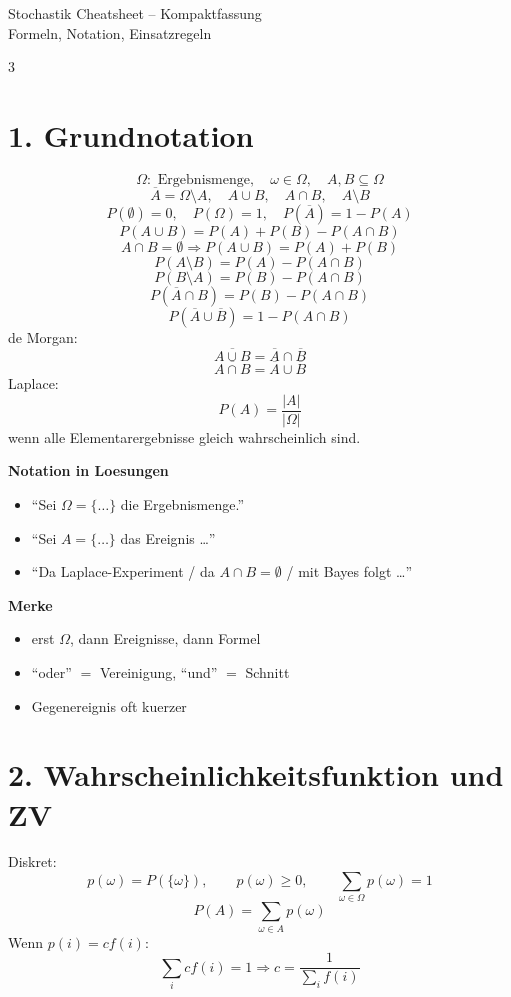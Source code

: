\documentclass[a4paper,8pt,landscape]{article}
\begin{document}
\scriptsize

\begin{center}
{\Large Stochastik Cheatsheet -- Kompaktfassung}\\
Formeln, Notation, Einsatzregeln
\end{center}
\vspace{-0.4em}

\begin{multicols*}{3}

\section*{1. Grundnotation}
\[
\Omega:\text{ Ergebnismenge},\quad \omega\in\Omega,\quad A,B\subseteq\Omega
\]
\[
\overline A=\Omega\setminus A,\quad A\cup B,\quad A\cap B,\quad A\setminus B
\]
\[
P(\emptyset)=0,\quad P(\Omega)=1,\quad P(\overline A)=1-P(A)
\]
\[
P(A\cup B)=P(A)+P(B)-P(A\cap B)
\]
\[
A\cap B=\emptyset \Rightarrow P(A\cup B)=P(A)+P(B)
\]
\[
P(A\setminus B)=P(A)-P(A\cap B)
\]
\[
P(B\setminus A)=P(B)-P(A\cap B)
\]
\[
P(\overline A\cap B)=P(B)-P(A\cap B)
\]
\[
P(\overline A\cup \overline B)=1-P(A\cap B)
\]
de Morgan:
\[
\overline{A\cup B}=\overline A\cap \overline B
\]
\[
\overline{A\cap B}=\overline A\cup \overline B
\]
Laplace:
\[
P(A)=\frac{|A|}{|\Omega|}
\]
wenn alle Elementarergebnisse gleich wahrscheinlich sind.

\textbf{Notation in Loesungen}
\begin{itemize}
  \item ``Sei $\Omega=\{\dots\}$ die Ergebnismenge.''
  \item ``Sei $A=\{\dots\}$ das Ereignis \dots''
  \item ``Da Laplace-Experiment / da $A\cap B=\emptyset$ / mit Bayes folgt \dots''
\end{itemize}

\textbf{Merke}
\begin{itemize}
  \item erst $\Omega$, dann Ereignisse, dann Formel
  \item ``oder'' $=$ Vereinigung, ``und'' $=$ Schnitt
  \item Gegenereignis oft kuerzer
\end{itemize}

\section*{2. Wahrscheinlichkeitsfunktion und ZV}
Diskret:
\[
p(\omega)=P(\{\omega\}),\qquad p(\omega)\ge 0,\qquad \sum_{\omega\in\Omega}p(\omega)=1
\]
\[
P(A)=\sum_{\omega\in A}p(\omega)
\]
Wenn $p(i)=c f(i)$:
\[
\sum_i c f(i)=1 \Rightarrow c=\frac{1}{\sum_i f(i)}
\]


\end{multicols*}
\end{document}

